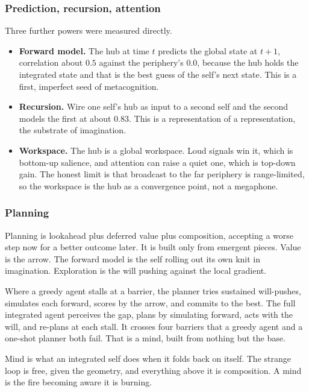 \subsubsection{Prediction, recursion, attention}

Three further powers were measured directly.

\begin{itemize}
\item \textbf{Forward model.} The hub at time $t$ predicts the global state at $t+1$, correlation about $0.5$ against the periphery's $0.0$, because the hub holds the integrated state and that is the best guess of the self's next state. This is a first, imperfect seed of metacognition.
\item \textbf{Recursion.} Wire one self's hub as input to a second self and the second models the first at about $0.83$. This is a representation of a representation, the substrate of imagination.
\item \textbf{Workspace.} The hub is a global workspace. Loud signals win it, which is bottom-up salience, and attention can raise a quiet one, which is top-down gain. The honest limit is that broadcast to the far periphery is range-limited, so the workspace is the hub as a convergence point, not a megaphone.
\end{itemize}

\subsubsection{Planning}

Planning is lookahead plus deferred value plus composition, accepting a worse step now for a better outcome later. It is built only from emergent pieces. Value is the arrow. The forward model is the self rolling out its own knit in imagination. Exploration is the will pushing against the local gradient.

Where a greedy agent stalls at a barrier, the planner tries sustained will-pushes, simulates each forward, scores by the arrow, and commits to the best. The full integrated agent perceives the gap, plans by simulating forward, acts with the will, and re-plans at each stall. It crosses four barriers that a greedy agent and a one-shot planner both fail. That is a mind, built from nothing but the base.

\begin{principle}
Mind is what an integrated self does when it folds back on itself. The strange loop is free, given the geometry, and everything above it is composition. A mind is the fire becoming aware it is burning.
\end{principle}

